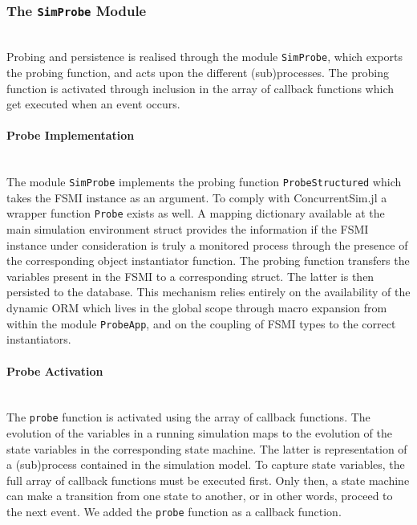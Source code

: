 \documentclass{juliacon}
\begin{document}
\subsubsection{The \textnormal{\texttt{SimProbe}} Module}\hfill\\
Probing and persistence is realised through the module \texttt{SimProbe}, which exports the probing function, and acts upon the different (sub)processes. The probing function is activated through inclusion in the array of callback functions which get executed when an event occurs. \vskip 6pt

\paragraph{Probe Implementation}\hfill\\

The module \texttt{SimProbe} implements the probing function \texttt{ProbeStructured} which takes the FSMI instance as an argument. To comply with ConcurrentSim.jl a wrapper function \texttt{Probe} exists as well. A mapping dictionary available at the main simulation environment struct provides the information if the FSMI instance under consideration is truly a monitored process through the presence of the corresponding object instantiator function. The probing function transfers the variables present in the FSMI to a corresponding struct. The latter is then persisted to the database. This mechanism relies entirely on the availability of the dynamic ORM which lives in the global scope through macro expansion from within the module \texttt{ProbeApp}, and on the coupling of FSMI types to the correct instantiators.\vskip 6pt

\paragraph{Probe Activation}\hfill\\
The \texttt{probe} function is activated using the array of callback functions. The evolution of the variables in a running simulation maps to the evolution of the state variables in the corresponding state machine. The latter is representation of a (sub)process contained in the simulation model. To capture state variables, the full array of callback functions must be executed first. Only then, a state machine can make a transition from one state to another, or in other words, proceed to the next event. We added the \texttt{probe} function as a callback function.\vskip 6pt
\end{document}
